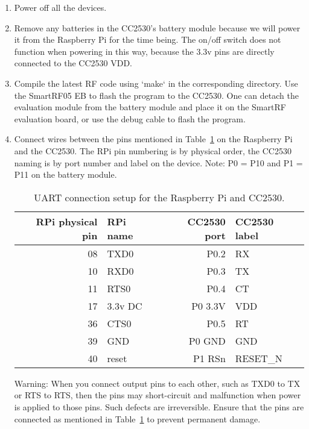 \documentclass{article}
\begin{document}
\begin{enumerate}
  \item Power off all the devices.
  \item Remove any batteries in the CC2530's battery module because we will 
        power it from the Raspberry Pi for the time being. The on/off switch 
        does not function when powering in this way, because the 3.3v pins are 
        directly connected to the CC2530 VDD.
  \item Compile the latest RF code using `make` in the corresponding directory. 
        Use the SmartRF05 EB to flash the program to the CC2530. One can detach 
        the evaluation module from the battery module and place it on the 
        SmartRF evaluation board, or use the debug cable to flash the program.
  \item Connect wires between the pins mentioned in Table~\ref{tab:uart} on the 
        Raspberry Pi and the CC2530. The RPi pin numbering is by physical 
        order, the CC2530 naming is by port number and label on the device. 
        Note: P0 = P10 and P1 = P11 on the battery module.

        \begin{table}[h!]
          \centering
          \begin{tabular}{rlrl}
            \toprule
            RPi physical pin & RPi name & CC2530 port & CC2530 label \\
            \midrule
            08 & TXD0 & P0.2 & RX \\
            10 & RXD0 & P0.3 & TX \\
            11 & RTS0 & P0.4 & CT \\
            17 & 3.3v DC & P0 3.3V & VDD \\
            36 & CTS0 & P0.5 & RT \\
            39 & GND & P0 GND & GND \\
            40 & reset & P1 RSn & RESET\_N \\
            \bottomrule
          \end{tabular}
          \caption{UART connection setup for the Raspberry Pi and CC2530.}
          \label{tab:uart}
        \end{table}

        Warning: When you connect output pins to each other, such as TXD0 to TX 
        or RTS to RTS, then the pins may short-circuit and malfunction when 
        power is applied to those pins. Such defects are irreversible. Ensure 
        that the pins are connected as mentioned in Table~\ref{tab:uart} to 
        prevent permanent damage.
\end{enumerate}
\end{document}
